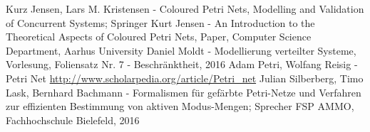 \documentclass[11pt,onecolumn,a4paper,DIV=calc]{scrartcl}
\begin{document}
\newpage
\begin{raggedright}%
\label{sec:literaturverzeichnis}
\begin{thebibliography}{Quellen}
   Kurz Jensen, Lars M. Kristensen - Coloured Petri Nets, Modelling and Validation of Concurrent Systems; Springer
     Kurt Jensen - An Introduction to the Theoretical Aspects of Coloured Petri Nets, Paper, Computer Science Department, Aarhus University
     Daniel Moldt - Modellierung verteilter Systeme, Vorlesung, Foliensatz Nr. 7 - Beschränktheit, 2016
     Adam Petri, Wolfang Reisig - Petri Net \url{http://www.scholarpedia.org/article/Petri_net}
     Julian Silberberg, Timo Lask, Bernhard Bachmann - Formalismen für gefärbte Petri-Netze und Verfahren zur effizienten Bestimmung von aktiven Modus-Mengen; Sprecher FSP AMMO, Fachhochschule Bielefeld, 2016


    
\end{thebibliography}
\end{raggedright}
\end{document}
